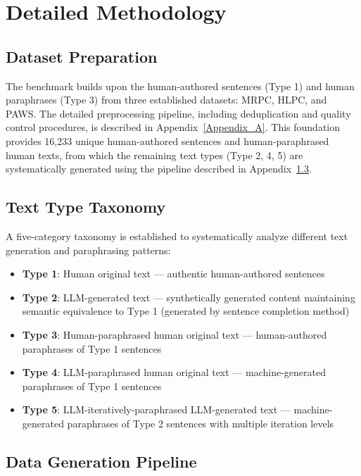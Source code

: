 \section{Detailed Methodology}
\label{Appendix_C}

\subsection{Dataset Preparation}
The benchmark builds upon the human-authored sentences (Type 1) and human paraphrases (Type 3) from three established datasets: MRPC, HLPC, and PAWS. The detailed preprocessing pipeline, including deduplication and quality control procedures, is described in Appendix~\ref{Appendix_A}. This foundation provides 16,233 unique human-authored sentences and human-paraphrased human texts, from which the remaining text types (Type 2, 4, 5) are systematically generated using the pipeline described in Appendix~\ref{appC:data_generation}.

\subsection{Text Type Taxonomy}
\label{appC:taxonomy_definition}
A five-category taxonomy is established to systematically analyze different text generation and paraphrasing patterns:

\begin{itemize}
    \item \textbf{Type 1}: Human original text --- authentic human-authored sentences
    \item \textbf{Type 2}: LLM-generated text --- synthetically generated content maintaining semantic equivalence to Type 1 (generated by sentence completion method)
    \item \textbf{Type 3}: Human-paraphrased human original text --- human-authored paraphrases of Type 1 sentences
    \item \textbf{Type 4}: LLM-paraphrased human original text --- machine-generated paraphrases of Type 1 sentences
    \item \textbf{Type 5}: LLM-iteratively-paraphrased LLM-generated text --- machine-generated paraphrases of Type 2 sentences with multiple iteration levels
\end{itemize}

\subsection{Data Generation Pipeline}
\label{appC:data_generation}

